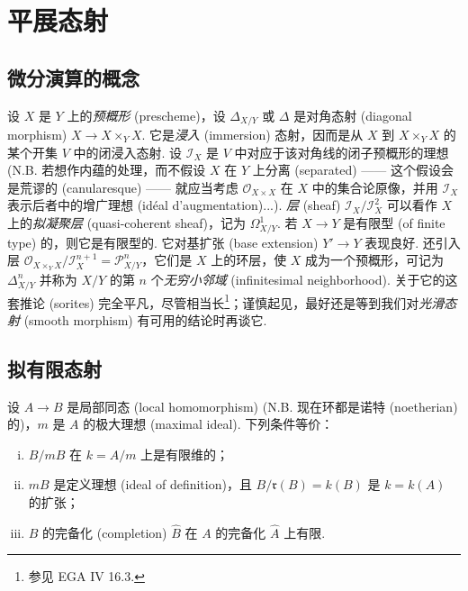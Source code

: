 ﻿%
\chapter{平展态射}

\section{微分演算的概念}

设 $X$ 是 $Y$ 上的\emph{预概形} (prescheme)，设 $\Delta_{X/Y}$ 或 $\Delta$ 是对角态射 (diagonal morphism) $X \to X \times_Y X$. 它是\emph{浸入} (immersion) 态射，因而是从 $X$ 到 $X \times_Y X$ 的某个开集 $V$ 中的闭浸入态射. 设 $\mathcal{I}_X$ 是 $V$ 中对应于该对角线的闭子预概形的理想 (N.B. 若想作内蕴的处理，而不假设 $X$ 在 $Y$ 上分离 (separated) —— 这个假设会是荒谬的 (canularesque) —— 就应当考虑 $\mathcal{O}_{X \times X}$ 在 $X$ 中的集合论原像，并用 $\mathcal{I}_X$ 表示后者中的增广理想 (idéal d'augmentation)...). \emph{层} (sheaf) $\mathcal{I}_X / \mathcal{I}_X^2$ 可以看作 $X$ 上的\emph{拟凝聚层} (quasi-coherent sheaf)，记为 $\varOmega_{X/Y}^{1}$. 若 $X \to Y$ 是有限型 (of finite type) 的，则它是有限型的. 它对基扩张 (base extension) $Y' \to Y$ 表现良好. 还引入层 $\mathcal{O}_{X \times_Y X} / \mathcal{I}_X^{n+1} = \mathcal{P}_{X/Y}^{n}$，它们是 $X$ 上的环层，使 $X$ 成为一个预概形，可记为 $\Delta_{X/Y}^{n}$ 并称为 $X/Y$ 的第 $n$ 个\emph{无穷小邻域} (infinitesimal neighborhood). 关于它的这套推论 (sorites) 完全平凡，尽管相当长\footnote{参见 EGA IV 16.3.}；谨慎起见，最好还是等到我们对\emph{光滑态射} (smooth morphism) 有可用的结论时再谈它.

\section{拟有限态射}

\begin{proposition}\label{prop:I.2.1}
设 $A \to B$ 是局部同态 (local homomorphism) (N.B. 现在环都是诺特 (noetherian) 的)，$m$ 是 $A$ 的极大理想 (maximal ideal). 下列条件等价：
\begin{enumerate}[(i)]
\item $B/mB$ 在 $k = A/m$ 上是有限维的；
\item $mB$ 是定义理想 (ideal of definition)，且 $B/\mathfrak{r}(B) = k(B)$ 是 $k = k(A)$ 的扩张；
\item $B$ 的完备化 (completion) $\widehat{B}$ 在 $A$ 的完备化 $\widehat{A}$ 上有限.
\end{enumerate}
\end{proposition}

